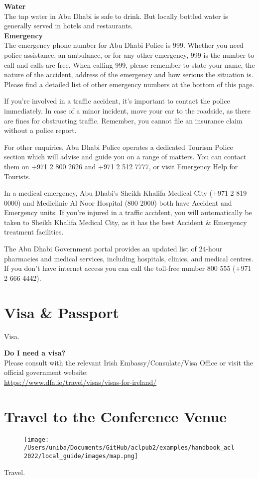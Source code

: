 {\large \textbf{Water}}\\
The tap water in Abu Dhabi is safe to drink. But locally bottled water is generally served in hotels and restaurants.\\

{\large \textbf{Emergency}\\}
The emergency phone number for Abu Dhabi Police is 999. 
Whether you need police assistance, an ambulance, or for any other emergency, 999 is the number to call and calls are free. 
When calling 999, please remember to state your name, the nature of the accident, address of the emergency and how serious the situation is. 
Please find a detailed list of other emergency numbers at the bottom of this page.

If you’re involved in a traffic accident, it’s important to contact the police immediately. 
In case of a minor incident, move your car to the roadside, as there are fines for obstructing traffic. 
Remember, you cannot file an insurance claim without a police report.

For other enquiries, Abu Dhabi Police operates a dedicated Tourism Police section which will advise and guide you on a range of matters. 
You can contact them on +971 2 800 2626 and +971 2 512 7777, or visit Emergency Help for Tourists.

In a medical emergency, Abu Dhabi’s Sheikh Khalifa Medical City (+971 2 819 0000) and Mediclinic Al Noor Hospital (800 2000) both have Accident and Emergency units. 
If you’re injured in a traffic accident, you will automatically be taken to Sheikh Khalifa Medical City, as it has the best Accident & Emergency treatment facilities.

The Abu Dhabi Government portal provides an updated list of 24-hour pharmacies and medical services, including hospitals, clinics, and medical centres. 
If you don’t have internet access you can call the toll-free number 800 555 (+971 2 666 4442).\\

\section{Visa \& Passport}
Visa.

{\large \textbf{Do I need a visa?}}\\
Please consult with the relevant Irish Embassy/Consulate/Visa Office or visit the official government website: \\
\url{https://www.dfa.ie/travel/visas/visas-for-ireland/}

 \leavevmode\newline


 \leavevmode\newline
\section{Travel to the Conference Venue}

 \begin{figure}[h!]
  \centering
      \texttt{[image: /Users/uniba/Documents/GitHub/aclpub2/examples/handbook\_acl2022/local\_guide/images/map.png]}
 \end{figure}
 \leavevmode\newline
Travel.